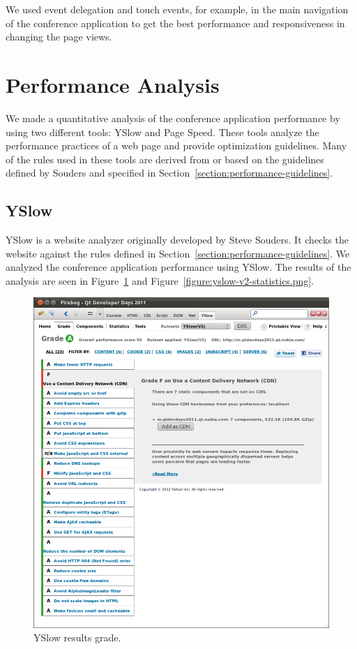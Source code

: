 We used event delegation and touch events, for example, in the main
navigation of the conference application to get the best performance
and responsiveness in changing the page views.

\section{Performance Analysis}
\label{section:performance-analysis}

We made a quantitative analysis of the conference application
performance by using two different tools: YSlow and Page Speed. These
tools analyze the performance practices of a web page and provide
optimization guidelines. Many of the rules used in these tools are
derived from or based on the guidelines defined by Souders
\cite{souders2007high, souders2009even} and specified in
Section~\ref{section:performance-guidelines}.

\subsection{YSlow}

YSlow is a website analyzer originally developed by Steve Souders. It
checks the website against the rules defined in
Section~\ref{section:performance-guidelines}. We analyzed the
conference application performance using YSlow. The results of the
analysis are seen in Figure~\ref{figure:yslow-v2-grade.png} and
Figure~\ref{figure:yslow-v2-statistics.png}.

\begin{figure}[ht]
  \begin{center}
    \includegraphics[width=\textwidth]{images/yslow-v2-grade.png}
    \caption{YSlow results grade.}
    \label{figure:yslow-v2-grade.png}
  \end{center}
\end{figure}

